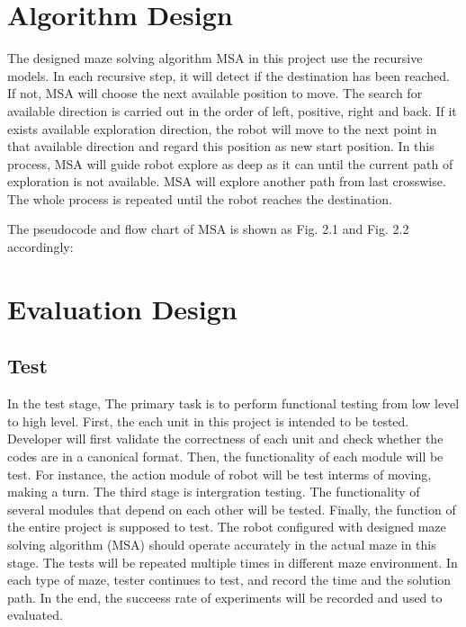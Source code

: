 \documentclass[11pt,times,oneside,openright,hardcopy]{eeereport}
\begin{document}
\section{Algorithm Design}
The designed maze solving algorithm MSA in this project use the recursive models. In each recursive step, it will detect if the destination has been reached. If not, MSA will choose the next available position to move. 
The search for available direction is carried out in the order of left, positive, right and back. If it exists available exploration direction, the robot will move to the next point in that available direction and regard this position as new start position.
In this process, MSA will guide robot explore as deep as it can until the current path of exploration is not available. MSA will explore another path from last crosswise. The whole process is repeated until the robot reaches the destination. 

The pseudocode and flow chart of MSA is shown as Fig. 2.1 and Fig. 2.2 accordingly:




\section{Evaluation Design}

\subsection{Test}
In the test stage, The primary task is to perform functional testing from low level to high level. 
First, the each unit in this project is intended to be tested. Developer will first validate the correctness of each unit and check whether the codes are in a canonical format. 
Then, the functionality of each module will be test. For instance, the action module of robot will be test interms of moving, making a turn.
The third stage is intergration testing. The functionality of several modules that depend on each other will be tested.
Finally, the function of the entire project is supposed to test. The robot configured with designed maze solving algorithm (MSA) should operate accurately in the actual maze in this stage.
The tests will be repeated multiple times in different maze environment. In each type of maze, tester continues to test, and record the time and the solution path.
In the end, the succeess rate of experiments will be recorded and used to evaluated.
\end{document}
